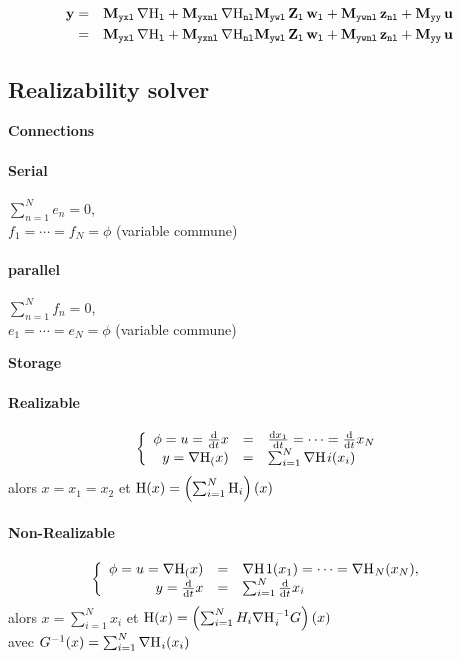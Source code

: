 \documentclass[10pt,a4paper]{article}
\begin{document}
{\begin{eqnarray}
\vy & = &\M{yxl}\,\nabla \Hl + \M{yxnl}\,\nabla \Hnl\M{ywl}\,\mat Z_{\lab l}\,\vwl + \M{ywnl}\,\vznl + \M{yy}\,\vu\\
&=& \M{yxl}\,\nabla \Hl + \M{yxnl}\,\nabla \Hnl\M{ywl}\,\mat Z_{\lab l}\,\vwl + \M{ywnl}\,\vznl + \M{yy}\,\vu\\
\end{eqnarray}

\subsection{Realizability solver}
%
\textbf{Connections\\}
\paragraph{Serial}
$\sum_{n=1}^N e_n = 0$, \\
$f_1 = \cdots = f_N = \phi$ (variable commune)
\paragraph{parallel}
$\sum_{n=1}^N f_n = 0$,\\
 $e_1 = \cdots = e_N = \phi$ (variable commune)

\textbf{Storage}
\paragraph{Realizable}
$$\left\{ \begin{array}{rcl}
\phi = u =\D{}{t} x &=& \D{x_1}{t} =\cdots = \D{}{t}{x_N} \\
y = \dxH(x)&=& \sum_{i=1}^N\dxH{}{}_{}i(x_i) \end{array}\right.$$
alors $ x = x_1 = x_2 $ et $\H(x) = \left(\sum_{i=1}^N \H_i\right)(x)$
\paragraph{Non-Realizable}
$$\left\{ \begin{array}{rcl}
\phi = u =\dxH (x)& =& \dxH{}{}_{}{}1(x_1) =\cdots = \dxH{}{}_N(x_N),\\
y=  \D{}{t}{x} & =& \sum_{i=1}^N \D{}{t}{x_i} \end{array}\right.$$
alors $ x =\sum_{i=1}^N x_i $ et $\H(x) = \left(\sum_{i=1}^N H_i \dxH{}{}_i^{-1} G \right) (x) $ \\
avec $G^{-1}(x) = \sum_{i=1}^N\dxH{}{}_i(x_i)$


}
\end{document}
